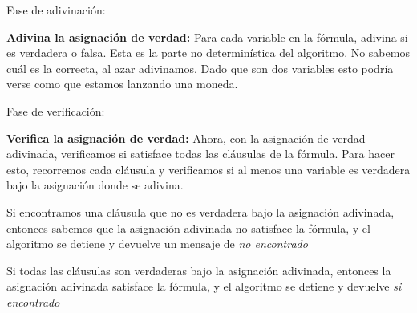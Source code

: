 \begin{myitemize}
    \item Fase de adivinación:
    
    \textbf{Adivina la asignación de verdad:} Para cada variable en la fórmula, adivina si es verdadera o falsa. Esta es 
    la parte no determinística del algoritmo. No sabemos cuál es la correcta, al azar adivinamos. Dado que son dos 
    variables esto podría verse como que estamos lanzando una moneda. 

    \item Fase de verificación:
    
    \textbf{Verifica la asignación de verdad:} Ahora, con la asignación de verdad adivinada, verificamos si satisface 
    todas las cláusulas de la fórmula. Para hacer esto, recorremos cada cláusula y verificamos si al menos una variable 
    es verdadera bajo la asignación donde se adivina.
    \begin{myitemize}
        \item Si encontramos una cláusula que no es verdadera bajo la asignación adivinada, entonces sabemos que la 
                asignación adivinada no satisface la fórmula, y el algoritmo se detiene y devuelve un mensaje 
                de \textit{no encontrado}
        \item Si todas las cláusulas son verdaderas bajo la asignación adivinada, entonces la asignación adivinada 
        satisface la fórmula, y el algoritmo se detiene y devuelve \textit{si encontrado}
    \end{myitemize}
\end{myitemize}